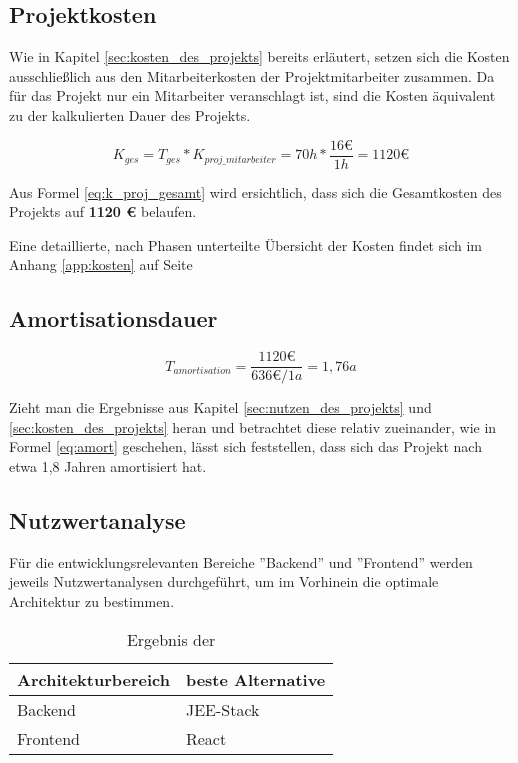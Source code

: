 \documentclass[12pt, xcolor=dvipsnames]{scrartcl}
\begin{document}
\subsection{Projektkosten}

Wie in Kapitel \ref{sec:kosten_des_projekts} bereits erläutert, setzen sich die Kosten ausschließlich aus den Mitarbeiterkosten der Projektmitarbeiter zusammen. Da für das Projekt nur ein Mitarbeiter veranschlagt ist, sind die Kosten äquivalent zu der kalkulierten Dauer des Projekts.

\begin{equation} \label{eq:k_proj_gesamt}
	K_{ges} = T_{ges} * K_{proj\_mitarbeiter} = 70h * \frac{16 \euro}{1h} = 1120 \euro
\end{equation}

Aus Formel \ref{eq:k_proj_gesamt} wird ersichtlich, dass sich die Gesamtkosten des Projekts auf \textbf{1120 \euro{}} belaufen.

Eine detaillierte, nach Phasen unterteilte Übersicht der Kosten findet sich im Anhang \ref{app:kosten} auf Seite \pageref{app:kosten}

\subsection{Amortisationsdauer}

\begin{equation} \label{eq:amort}
	T_{amortisation} = \frac{1120 \euro}{636 \euro / 1a} = 1,76a
\end{equation}

Zieht man die Ergebnisse aus Kapitel \ref{sec:nutzen_des_projekts} und \ref{sec:kosten_des_projekts} heran und betrachtet diese relativ zueinander, wie in Formel \ref{eq:amort} geschehen, lässt sich feststellen, dass sich das Projekt nach etwa 1,8 Jahren amortisiert hat.

\subsection{Nutzwertanalyse}
\label{sec:nutzwertanalyse}

Für die entwicklungsrelevanten Bereiche ''Backend'' und ''Frontend'' werden jeweils Nutzwertanalysen durchgeführt, um im Vorhinein die optimale Architektur zu bestimmen.

\begin{table}[H]
	\centering
	\begin{tabular}{ll}

		\rowcolor{white!15}				
		\textbf{Architekturbereich} & \textbf{beste Alternative} \\\hline		
				
		Backend & JEE-Stack \\
		Frontend & React	\\	
			    
	\end{tabular}
	\caption{Ergebnis der }
	\label{tab:nutzwertanalyse}
\end{table}
\end{document}
